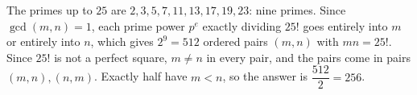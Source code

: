 The primes up to $25$ are $2,3,5,7,11,13,17,19,23$: nine primes. Since $\gcd(m,n)=1$, each prime power $p^{e}$ exactly dividing $25!$ goes entirely into $m$ or entirely into $n$, which gives $2^9=512$ ordered pairs $(m,n)$ with $mn=25!$. Since $25!$ is not a perfect square, $m\ne n$ in every pair, and the pairs come in pairs $(m,n),(n,m)$. Exactly half have $m<n$, so the answer is $\dfrac{512}{2}=\boxed{256}$.
